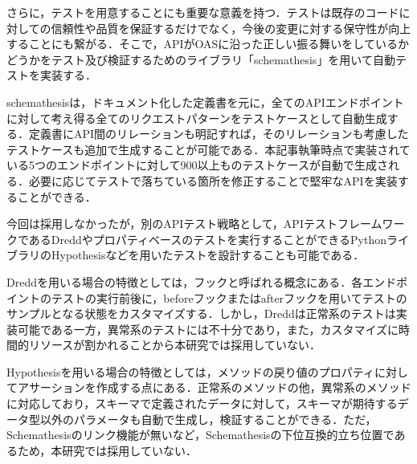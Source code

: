           \par さらに，テストを用意することにも重要な意義を持つ．テストは既存のコードに対しての信頼性や品質を保証するだけでなく，今後の変更に対する保守性が向上することにも繋がる．そこで，APIがOASに沿った正しい振る舞いをしているかどうかをテスト及び検証するためのライブラリ「schemathesis\cite{schemathesis}」を用いて自動テストを実装する．
          \par schemathesisは，ドキュメント化した定義書を元に，全てのAPIエンドポイントに対して考え得る全てのリクエストパターンをテストケースとして自動生成する．定義書にAPI間のリレーションも明記すれば，そのリレーションも考慮したテストケースも追加で生成することが可能である．本記事執筆時点で実装されている5つのエンドポイントに対して900以上ものテストケースが自動で生成される．必要に応じてテストで落ちている箇所を修正することで堅牢なAPIを実装することができる．
          \par 今回は採用しなかったが，別のAPIテスト戦略として，APIテストフレームワークであるDreddやプロパティベースのテストを実行することができるPythonライブラリのHypothesisなどを用いたテストを設計することも可能である．
          \par Dreddを用いる場合の特徴としては，フックと呼ばれる概念にある．各エンドポイントのテストの実行前後に，beforeフックまたはafterフックを用いてテストのサンプルとなる状態をカスタマイズする．しかし，Dreddは正常系のテストは実装可能である一方，異常系のテストには不十分であり，また，カスタマイズに時間的リソースが割かれることから本研究では採用していない．
          \par Hypothesisを用いる場合の特徴としては，メソッドの戻り値のプロパティに対してアサーションを作成する点にある．正常系のメソッドの他，異常系のメソッドに対応しており，スキーマで定義されたデータに対して，スキーマが期待するデータ型以外のパラメータも自動で生成し，検証することができる．ただ，Schemathesisのリンク機能が無いなど，Schemathesisの下位互換的立ち位置であるため，本研究では採用していない．
      
